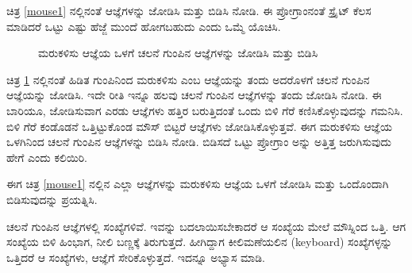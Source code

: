 \vspace{-0.5cm}
ಚಿತ್ರ \ref{mouse1} ನಲ್ಲಿನಂತೆ ಆಜ್ಞೆಗಳನ್ನು ಜೋಡಿಸಿ ಮತ್ತು ಬಿಡಿಸಿ ನೋಡಿ.  ಈ ಪ್ರೋಗ್ರಾಂನಂತೆ ಸ್ಪ್ರೈಟ್ ಕೆಲಸ ಮಾಡಿದರೆ ಒಟ್ಟು ಎಷ್ಟು ಹೆಜ್ಜೆ ಮುಂದೆ ಹೋಗಬಹುದು ಎಂದು ಒಮ್ಮೆ ಯೊಚಿಸಿ.

\begin{figure}[h]
\begin{center}
\begin{Scratch}[1]
\end{Scratch}
\caption{ಮರುಕಳಿಸು ಆಜ್ಞೆಯ ಒಳಗೆ ಚಲನೆ ಗುಂಪಿನ ಆಜ್ಞೆಗಳನ್ನು ಜೋಡಿಸಿ ಮತ್ತು ಬಿಡಿಸಿ}
\label{mouse2}
\end{center}
\end{figure}

ಚಿತ್ರ \ref{mouse2} ನಲ್ಲಿನಂತೆ  ಹಿಡಿತ ಗುಂಪಿನಿಂದ ಮರುಕಳಿಸು ಎಂಬ ಆಜ್ಞೆಯನ್ನು ತಂದು ಅದರೊಳಗೆ ಚಲನೆ ಗುಂಪಿನ ಆಜ್ಞೆಯನ್ನು ಜೋಡಿಸಿ.  ಇದೇ ರೀತಿ ಇನ್ನೂ ಹಲವು ಚಲನೆ ಗುಂಪಿನ ಆಜ್ಞೆಗಳನ್ನು ತಂದು  ಜೋಡಿಸಿ ನೋಡಿ. ಈ ಬಾರಿಯೂ,  ಜೋಡಿಸುವಾಗ ಎರಡು ಆಜ್ಞೆಗಳು ಹತ್ತಿರ ಬರುತ್ತಿದಂತೆ ಒಂದು ಬಿಳಿ ಗೆರೆ ಕಣಿಸಿಕೊಳ್ಳುವುದನ್ನು ಗಮನಿಸಿ.  ಬಿಳಿ ಗೆರೆ ಕಂಡೊಡನೆ ಒತ್ತಿಟ್ಟುಕೊಂಡ ಮೌಸ್ ಬಿಟ್ಟರೆ ಆಜ್ಞೆಗಳು ಜೋಡಿಸಿಕೊಳ್ಳುತ್ತವೆ.  ಈಗ ಮರುಕಳಿಸು ಆಜ್ಞೆಯ ಒಳಗಿನಿಂದ ಚಲನೆ ಗುಂಪಿನ ಆಜ್ಞೆಗಳನ್ನು ಬಿಡಿಸಿ ನೋಡಿ.  ಬಿಡಿಸದೆ ಒಟ್ಟು ಪ್ರೋಗ್ರಾಂ ಅನ್ನು ಅತ್ತಿತ್ತ ಜರುಗಿಸುವುದು ಹೇಗೆ ಎಂದು ಕಲಿಯಿರಿ. 

ಈಗ ಚಿತ್ರ \ref{mouse1} ನಲ್ಲಿನ ಎಲ್ಲಾ ಆಜ್ಞೆಗಳನ್ನು ಮರುಕಳಿಸು ಆಜ್ಞೆಯ ಒಳಗೆ ಜೋಡಿಸಿ ಮತ್ತು ಒಂದೊಂದಾಗಿ ಬಿಡಿಸುವುದನ್ನು ಪ್ರಯತ್ನಿಸಿ.

ಚಲನೆ ಗುಂಪಿನ ಆಜ್ಞೆಗಳಲ್ಲಿ ಸಂಖ್ಯೆಗಳಿವೆ. ಇವನ್ನು ಬದಲಾಯಿಸಬೇಕಾದರೆ ಆ ಸಂಖ್ಯೆಯ ಮೇಲೆ ಮೌಸ್ನಿಂದ  ಒತ್ತಿ.  ಆಗ ಸಂಖ್ಯೆಯ ಬಿಳಿ ಹಿಂಭಾಗ, ನೀಲಿ ಬಣ್ಣಕ್ಕೆ ತಿರುಗುತ್ತದೆ. ಹೀಗಿದ್ದಾಗ ಕೀಲಿಮಣೆಯಲಿನ  (\textenglish{keyboard}) ಸಂಖ್ಯೆಗಳ್ಳನ್ನು ಒತ್ತಿದರೆ ಆ ಸಂಖ್ಯೆಗಳು, ಆಜ್ಞೆಗೆ ಸೇರಿಕೊಳ್ಳುತ್ತದೆ. ಇದನ್ನೂ ಅಭ್ಯಾಸ ಮಾಡಿ. 

